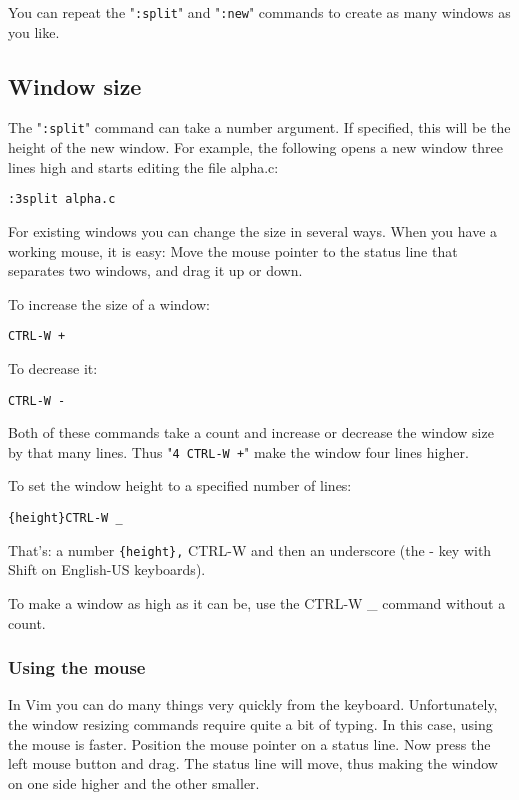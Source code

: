 You can repeat the "\verb!:split!" and "\verb!:new!" commands to create as many windows as you like.

\subsection{Window size}
The "\verb!:split!" command can take a number argument.
If specified, this will be the height of the new window.
For example, the following opens a new window three lines high and starts editing the file alpha.c:

 \begin{Verbatim}[samepage=true]
 :3split alpha.c
 \end{Verbatim}

For existing windows you can change the size in several ways.
When you have a working mouse, it is easy: Move the mouse pointer to the status line that separates two windows, and drag it up or down.

To increase the size of a window:

 \begin{Verbatim}[samepage=true]
 CTRL-W +
 \end{Verbatim}

To decrease it:

 \begin{Verbatim}[samepage=true]
 CTRL-W -
 \end{Verbatim}

Both of these commands take a count and increase or decrease the window size by that many lines.
Thus "\verb!4 CTRL-W +!" make the window four lines higher.

To set the window height to a specified number of lines:

 \begin{Verbatim}[samepage=true]
 {height}CTRL-W _
 \end{Verbatim}

That's: a number \verb!{height},! CTRL-W and then an underscore (the - key with Shift on English-US keyboards).

To make a window as high as it can be, use the CTRL-W \_ command without a count.

\subsubsection{Using the mouse}
In Vim you can do many things very quickly from the keyboard.
Unfortunately, the window resizing commands require quite a bit of typing.
In this case, using the mouse is faster.
Position the mouse pointer on a status line.
Now press the left mouse button and drag.
The status line will move, thus making the window on one side higher and the other smaller.

